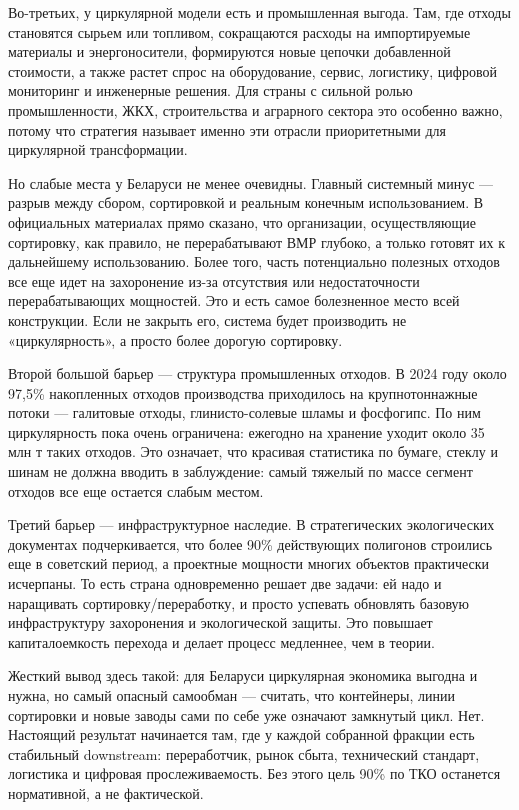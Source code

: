 \documentclass[14pt,a4paper]{extarticle}
\begin{document}
Во-третьих, у циркулярной модели есть и промышленная выгода. Там, где отходы становятся сырьем или топливом, сокращаются расходы на импортируемые материалы и энергоносители, формируются новые цепочки добавленной стоимости, а также растет спрос на оборудование, сервис, логистику, цифровой мониторинг и инженерные решения. Для страны с сильной ролью промышленности, ЖКХ, строительства и аграрного сектора это особенно важно, потому что стратегия называет именно эти отрасли приоритетными для циркулярной трансформации.

Но слабые места у Беларуси не менее очевидны. Главный системный минус --- разрыв между сбором, сортировкой и реальным конечным использованием. В официальных материалах прямо сказано, что организации, осуществляющие сортировку, как правило, не перерабатывают ВМР глубоко, а только готовят их к дальнейшему использованию. Более того, часть потенциально полезных отходов все еще идет на захоронение из-за отсутствия или недостаточности перерабатывающих мощностей. Это и есть самое болезненное место всей конструкции. Если не закрыть его, система будет производить не «циркулярность», а просто более дорогую сортировку.

Второй большой барьер --- структура промышленных отходов. В 2024 году около 97,5\% накопленных отходов производства приходилось на крупнотоннажные потоки --- галитовые отходы, глинисто-солевые шламы и фосфогипс. По ним циркулярность пока очень ограничена: ежегодно на хранение уходит около 35 млн т таких отходов. Это означает, что красивая статистика по бумаге, стеклу и шинам не должна вводить в заблуждение: самый тяжелый по массе сегмент отходов все еще остается слабым местом.

Третий барьер --- инфраструктурное наследие. В стратегических экологических документах подчеркивается, что более 90\% действующих полигонов строились еще в советский период, а проектные мощности многих объектов практически исчерпаны. То есть страна одновременно решает две задачи: ей надо и наращивать сортировку/переработку, и просто успевать обновлять базовую инфраструктуру захоронения и экологической защиты. Это повышает капиталоемкость перехода и делает процесс медленнее, чем в теории.

Жесткий вывод здесь такой: для Беларуси циркулярная экономика выгодна и нужна, но самый опасный самообман --- считать, что контейнеры, линии сортировки и новые заводы сами по себе уже означают замкнутый цикл. Нет. Настоящий результат начинается там, где у каждой собранной фракции есть стабильный downstream: переработчик, рынок сбыта, технический стандарт, логистика и цифровая прослеживаемость. Без этого цель 90\% по ТКО останется нормативной, а не фактической.
\end{document}
